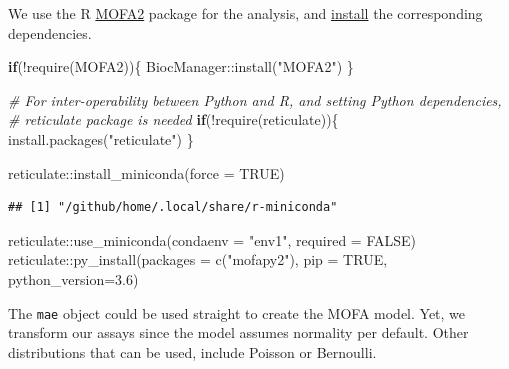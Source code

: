 \documentclass[
]{book}
\newenvironment{Shaded}{\begin{snugshade}}{\end{snugshade}}
\newcommand{\AttributeTok}[1]{\textcolor[rgb]{0.77,0.63,0.00}{#1}}
\newcommand{\CommentTok}[1]{\textcolor[rgb]{0.56,0.35,0.01}{\textit{#1}}}
\newcommand{\ConstantTok}[1]{\textcolor[rgb]{0.00,0.00,0.00}{#1}}
\newcommand{\ControlFlowTok}[1]{\textcolor[rgb]{0.13,0.29,0.53}{\textbf{#1}}}
\newcommand{\FloatTok}[1]{\textcolor[rgb]{0.00,0.00,0.81}{#1}}
\newcommand{\FunctionTok}[1]{\textcolor[rgb]{0.00,0.00,0.00}{#1}}
\newcommand{\NormalTok}[1]{#1}
\newcommand{\SpecialCharTok}[1]{\textcolor[rgb]{0.00,0.00,0.00}{#1}}
\newcommand{\StringTok}[1]{\textcolor[rgb]{0.31,0.60,0.02}{#1}}
\begin{document}
We use the R \href{https://biofam.github.io/MOFA2/index.html}{MOFA2} package
for the analysis, and \href{https://biofam.github.io/MOFA2/installation.html}{install} the corresponding dependencies.

\begin{Shaded}
\begin{Highlighting}[]
\ControlFlowTok{if}\NormalTok{(}\SpecialCharTok{!}\FunctionTok{require}\NormalTok{(MOFA2))\{}
\NormalTok{    BiocManager}\SpecialCharTok{::}\FunctionTok{install}\NormalTok{(}\StringTok{"MOFA2"}\NormalTok{)}
\NormalTok{\}}

\CommentTok{\# For inter{-}operability between Python and R, and setting Python dependencies,}
\CommentTok{\# reticulate package is needed}
\ControlFlowTok{if}\NormalTok{(}\SpecialCharTok{!}\FunctionTok{require}\NormalTok{(reticulate))\{}
    \FunctionTok{install.packages}\NormalTok{(}\StringTok{"reticulate"}\NormalTok{)}
\NormalTok{\}}

\NormalTok{reticulate}\SpecialCharTok{::}\FunctionTok{install\_miniconda}\NormalTok{(}\AttributeTok{force =} \ConstantTok{TRUE}\NormalTok{)}
\end{Highlighting}
\end{Shaded}

\begin{verbatim}
## [1] "/github/home/.local/share/r-miniconda"
\end{verbatim}

\begin{Shaded}
\begin{Highlighting}[]
\NormalTok{reticulate}\SpecialCharTok{::}\FunctionTok{use\_miniconda}\NormalTok{(}\AttributeTok{condaenv =} \StringTok{"env1"}\NormalTok{, }\AttributeTok{required =} \ConstantTok{FALSE}\NormalTok{)}
\NormalTok{reticulate}\SpecialCharTok{::}\FunctionTok{py\_install}\NormalTok{(}\AttributeTok{packages =} \FunctionTok{c}\NormalTok{(}\StringTok{"mofapy2"}\NormalTok{), }\AttributeTok{pip =} \ConstantTok{TRUE}\NormalTok{, }\AttributeTok{python\_version=}\FloatTok{3.6}\NormalTok{)}
\end{Highlighting}
\end{Shaded}

The \texttt{mae} object could be used straight to create the MOFA model. Yet, we transform
our assays since the model assumes normality per default. Other distributions that
can be used, include Poisson or Bernoulli.
\end{document}
